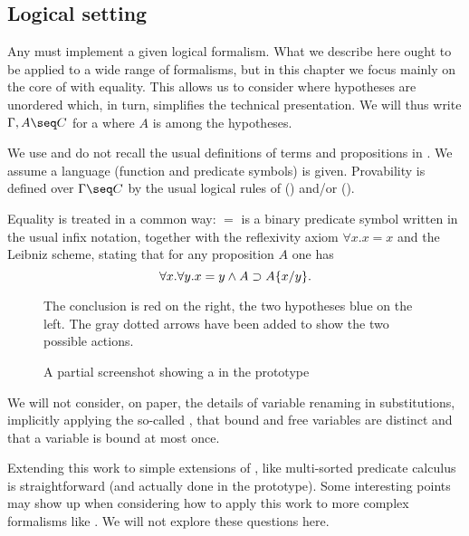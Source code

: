 \begin{scope}

\section{Logical setting}

Any  must implement a given logical formalism. What we describe
here ought to be applied to a wide range of formalisms, but in this chapter we
focus mainly on the core of   with equality. This
allows us to consider  where hypotheses are unordered which, in
turn, simplifies the technical presentation. We will thus write $\Gamma,A \seq
C$ for a  where $A$ is among the hypotheses.

We use and do not recall the usual definitions of terms and propositions in
. We assume a  language (function and predicate symbols)
is given. Provability is defined over  $\Gamma\seq C$ by the usual
logical rules of  () and/or  ().

Equality is treated in a common way: $=$ is a binary
predicate symbol written in the usual infix notation, together with the
reflexivity axiom $\forall x.x=x$ and the Leibniz scheme, stating that for any
proposition $A$ one has
$$\forall x.\forall y. x=y\land A \supset A \{ x / y \}.$$

\begin{figure*}
 \begin{center}
 \end{center}
 The conclusion is red on the right, the two hypotheses blue on the left. The
 gray dotted arrows have been added to show the two possible actions.
 \caption{A partial screenshot showing a  in the  prototype}
\end{figure*}

\AP We will not consider, on paper, the details of variable renaming in
substitutions, implicitly applying the so-called ,
that bound and free variables are distinct and that a variable is bound at most
once.

Extending this work to simple extensions of , like multi-sorted predicate
calculus is straightforward (and actually done in the  prototype). Some
interesting points may show up when considering how to apply this work to more
complex formalisms like . We will not explore these questions here.


\end{scope}
